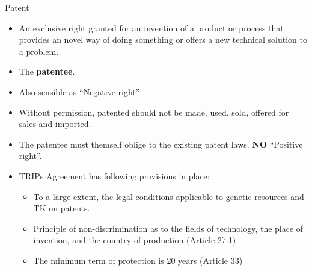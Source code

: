 \documentclass[ignorenonframetext,aspectratio=169]{beamer}
\providecommand{\tightlist}{%
  \setlength{\itemsep}{0pt}\setlength{\parskip}{0pt}}
\begin{document}
\begin{frame}{Patent}
\protect\hypertarget{patent}{}

\begin{itemize}
\tightlist
\item
  An exclusive right granted for an invention of a product or process
  that provides an novel way of doing something or offers a new
  technical solution to a problem.
\item
  The \textbf{patentee}.
\item
  Also sensible as ``Negative right''
\item
  Without permission, patented should not be made, used, sold, offered
  for sales and imported.
\item
  The patentee must themself oblige to the existing patent laws.
  \textbf{NO} ``Positive right''.
\item
  TRIPs Agreement has following provisions in place:

  \begin{itemize}
  \tightlist
  \item
    To a large extent, the legal conditions applicable to genetic
    resources and TK on patents.
  \item
    Principle of non-discrimination as to the fields of technology, the
    place of invention, and the country of production (Article 27.1)
  \item
    The minimum term of protection is 20 years (Article 33)
  \end{itemize}
\end{itemize}

\end{frame}
\end{document}

